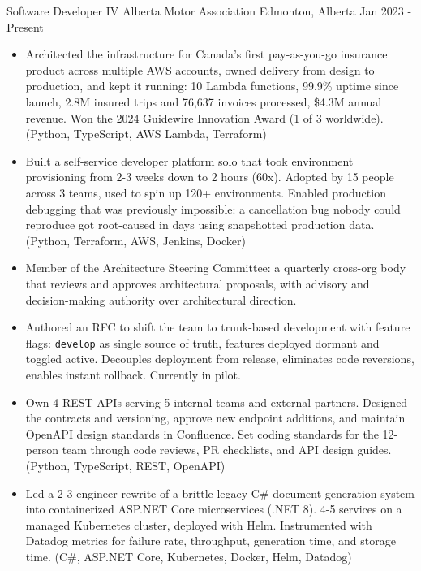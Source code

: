 
\begin{cventries}
    \cventry
        {Software Developer IV}
        {Alberta Motor Association}
        {Edmonton, Alberta}
        {Jan 2023 - Present}
        {
            \begin{itemize}
                \item Architected the infrastructure for Canada's first pay-as-you-go insurance product across multiple AWS accounts, owned delivery from design to production, and kept it running: 10 Lambda functions, 99.9\% uptime since launch, 2.8M insured trips and 76,637 invoices processed, \$4.3M annual revenue. Won the 2024 Guidewire Innovation Award (1 of 3 worldwide). (Python, TypeScript, AWS Lambda, Terraform)
                \item Built a self-service developer platform solo that took environment provisioning from 2-3 weeks down to 2 hours (60x). Adopted by 15 people across 3 teams, used to spin up 120+ environments. Enabled production debugging that was previously impossible: a cancellation bug nobody could reproduce got root-caused in days using snapshotted production data. (Python, Terraform, AWS, Jenkins, Docker)
                \item Member of the Architecture Steering Committee: a quarterly cross-org body that reviews and approves architectural proposals, with advisory and decision-making authority over architectural direction.
                \item Authored an RFC to shift the team to trunk-based development with feature flags: \texttt{develop} as single source of truth, features deployed dormant and toggled active. Decouples deployment from release, eliminates code reversions, enables instant rollback. Currently in pilot.
                \item Own 4 REST APIs serving 5 internal teams and external partners. Designed the contracts and versioning, approve new endpoint additions, and maintain OpenAPI design standards in Confluence. Set coding standards for the 12-person team through code reviews, PR checklists, and API design guides. (Python, TypeScript, REST, OpenAPI)
                \item Led a 2-3 engineer rewrite of a brittle legacy C\# document generation system into containerized ASP.NET Core microservices (.NET 8). 4-5 services on a managed Kubernetes cluster, deployed with Helm. Instrumented with Datadog metrics for failure rate, throughput, generation time, and storage time. (C\#, ASP.NET Core, Kubernetes, Docker, Helm, Datadog)

\end{itemize}}
\end{cventries}
